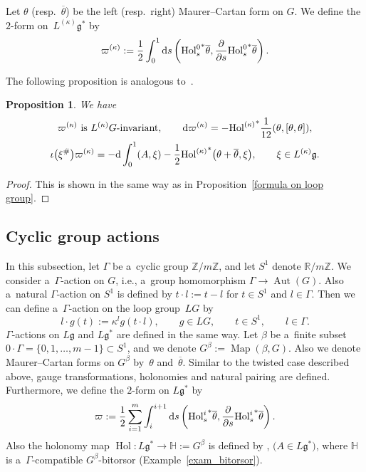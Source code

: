 \documentclass[pdftex]{sigma}
\numberwithin{equation}{section}
\newtheorem{Proposition}[Theorem]{Proposition}
\theoremstyle{definition}
\newcommand{\Map}{\operatorname{Map}}
\newcommand{\Aut}{\operatorname{Aut}}
\newcommand{\Hol}{\operatorname{Hol}}
\newcommand{\bH}{\mathbb{H}}
\newcommand{\bR}{\mathbb{R}}
\newcommand{\bZ}{\mathbb{Z}}
\begin{document}
Let $\theta$ (resp.\ $\overline{\theta}$) be the left (resp.\ right) Maurer--Cartan form on $G$.
We define the $2$-form on~$L^{(\kappa)}\mathfrak{g}^*$ by
\[
 \varpi ^{(\kappa)} := \frac{1}{2} \int_{0}^{1}{\rm d}s \left({\Hol^{0}_s}^* \overline{\theta}, \frac{\partial}{\partial s}{\Hol^{0}_s}^* \overline{\theta}\right).
 \]

The following proposition is analogous to~\cite[Proposition 8.1]{AMM}.

\begin{Proposition}We have
\begin{gather*}
 \varpi^{(\kappa)} \text{ is } L^{(\kappa)}G \text{-invariant},\qquad
 {\rm d} \varpi^{(\kappa)} = - {\Hol^{(\kappa)}}^* \frac{1}{12} (\theta,[\theta,\theta]),\\
 \iota\bigl(\xi^{\#}\bigr)\varpi^{(\kappa)} = - {\rm d} \int_{0}^{1}(A,\xi) - \frac{1}{2} {\Hol^{(\kappa)}}^*\bigl(\theta+\overline{\theta},\xi\bigr), \qquad \xi \in L^{(\kappa)}\mathfrak{g}.
\end{gather*}
\end{Proposition}

\begin{proof}
This is shown in the same way as in Proposition~\ref{formula on loop group}.
\end{proof}

\subsection{Cyclic group actions}

In this subsection, let $\Gamma$ be a~cyclic group $\bZ / m \bZ$, and let $S^{1}$ denote $\bR / m \bZ$.
We consider a~$\Gamma$-action on $G$, i.e., a~group homomorphism $\Gamma \to \Aut(G)$. Also a~natural $\Gamma$-action on $S^{1}$ is defined by
$ t \cdot l := t -l $ for $t \in S^{1}$ and $l \in \Gamma$.
Then we can define a~$\Gamma$-action on the loop group~$LG$ by
\[
l \cdot g (t) := \kappa^{l} g(t \cdot l) ,\qquad g \in LG,\qquad t \in S^{1},\qquad l \in \Gamma.
\]
$\Gamma$-actions on $L\mathfrak{g}$ and $L\mathfrak{g}^{*}$ are defined in the same way.
Let $\beta$ be a~finite subset $0\cdot \Gamma = \{0,1,\dots,\allowbreak {m-1}\} \subset S^{1}$, and we denote $G^{\beta} := \Map(\beta,G)$.
Also we denote Maurer--Cartan forms on $G^{\beta}$ by~$\theta$ and~$\overline{\theta}$.
Similar to the twisted case described above, gauge transformations, holonomies and natural pairing are defined.
Furthermore, we define the $2$-form on $L\mathfrak{g}^{*}$ by
\[
\varpi := \frac{1}{2} \sum_{i=1}^{m} \int_{i}^{i+1}{\rm d}s \left({\Hol^{i}_s}^{*}\overline{\theta},\frac{\partial}{\partial s}{\Hol^{i}_s}^{*}\overline{\theta}\right).
\]
Also the holonomy map $\Hol \colon L\mathfrak{g}^{*} \to \bH := G^{\beta}$ is defined by
\smash{$\Hol(A) := \bigl(\Hol^{i}_{i+1}(A)\bigr)^{m}_{i=1}$}, $\bigl(A \in L\mathfrak{g}^{*}\bigr)$,
where $\bH$ is a~$\Gamma$-compatible $G^{\beta}$-bitorsor (Example~\ref{exam_bitorsor}).
\end{document}
